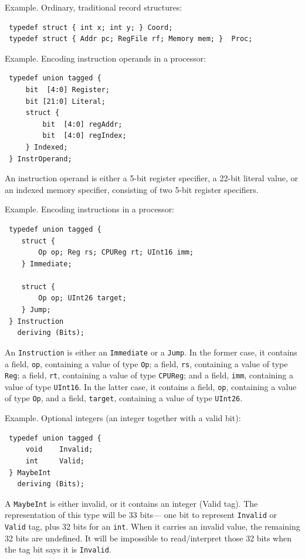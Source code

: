 \documentclass[twoside,letterpaper]{article}
\begin{document}
Example. Ordinary, traditional record structures:
\begin{verbatim}
 typedef struct { int x; int y; } Coord;
 typedef struct { Addr pc; RegFile rf; Memory mem; }  Proc;
\end{verbatim}

Example. Encoding instruction operands in a processor:
\begin{verbatim}
 typedef union tagged {
     bit  [4:0] Register;
     bit [21:0] Literal;
     struct {
         bit  [4:0] regAddr;
         bit  [4:0] regIndex;
     } Indexed;
 } InstrOperand;
\end{verbatim}
An instruction operand is either a 5-bit register specifier, a 22-bit
literal value, or an indexed memory specifier, consisting of two 5-bit
register specifiers.

Example.  Encoding instructions in a processor:
\begin{verbatim}
 typedef union tagged {
    struct {
        Op op; Reg rs; CPUReg rt; UInt16 imm;
    } Immediate;

    struct {
        Op op; UInt26 target;
    } Jump;
 } Instruction
   deriving (Bits);
\end{verbatim}
An \texttt{Instruction} is either an \texttt{Immediate} or a \texttt{Jump}.
In the former case, it contains
a field, \texttt{op}, containing a value of type \texttt{Op};
a field, \texttt{rs}, containing a value of type \texttt{Reg};
a field, \texttt{rt}, containing a value of type \texttt{CPUReg}; and
a field, \texttt{imm}, containing a value of type \texttt{UInt16}.
In the latter case, it contains
a field, \texttt{op}, containing a value of type \texttt{Op}, and
a field, \texttt{target}, containing a value of type \texttt{UInt26}.

Example. Optional integers (an integer together with a valid bit):
\begin{verbatim}
 typedef union tagged {
     void    Invalid;
     int     Valid;
 } MaybeInt
   deriving (Bits);
\end{verbatim}
A \texttt{MaybeInt} is either invalid, or it contains an
integer (Valid tag).  The representation of this type will be 33 bits---
one bit to represent \texttt{Invalid} or \texttt{Valid} tag, plus 32 bits for an
\texttt{int}.  When it carries an invalid value, the remaining 32 bits
are undefined.  It will be impossible to read/interpret those 32 bits
when the tag bit says it is \texttt{Invalid}.
\end{document}
